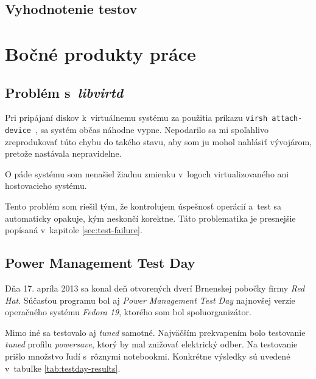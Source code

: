%
%

\section{Vyhodnotenie testov}


%
%

\chapter{Bočné produkty práce}

%
%

\section{Problém s~\emph{libvirtd}}
\label{sec:libvirt-problem}

Pri pripájaní diskov k~virtuálnemu systému za použitia príkazu \texttt{virsh
attach-device }, sa systém občas náhodne vypne. Nepodarilo sa mi spoľahlivo
zreprodukovať túto chybu do takého stavu, aby som ju mohol nahlásiť vývojárom,
pretože nastávala nepravidelne. 

O páde systému som nenašiel žiadnu zmienku v~logoch virtualizovaného ani
hostovacieho systému. 

Tento problém som riešil tým, že kontrolujem úspešnosť operácií a~test sa
automaticky opakuje, kým neskončí korektne. Táto problematika je presnejšie
popísaná v~kapitole \ref{sec:test-failure}.

%
%

\section{Power Management Test Day}

Dňa 17. apríla 2013 sa konal deň otvorených dverí Brnenskej pobočky firmy
\emph{Red Hat}. Súčasťou programu bol aj \emph{Power Management Test Day}
najnovšej verzie operačného systému \emph{Fedora 19}, ktorého som bol
spoluorganizátor. 

Mimo iné sa testovalo aj \emph{tuned} samotné. Najväčším prekvapením bolo
testovanie \emph{tuned} profilu \emph{powersave}, ktorý by mal znižovať
elektrický odber. Na testovanie prišlo množstvo ľudí s~rôznymi notebookmi.
Konkrétne výsledky sú uvedené v~tabuľke \ref{tab:testday-results}.

